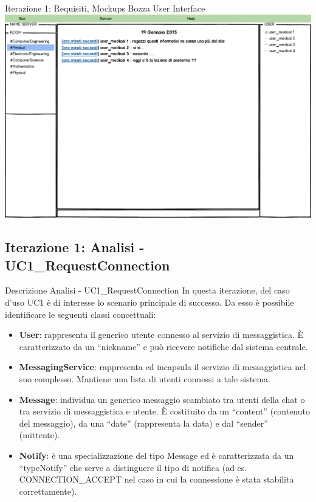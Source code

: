 \documentclass[t]{beamer} %
\let\olditem=\item%
\renewcommand{\item}{\olditem \justifying}%
\begin{document}
\begin{frame} {Iterazione 1: Requisiti, Mockups Bozza User Interface}
    \includegraphics[scale=0.28]{image_mockups/09_snuc_user_room_medical.png}{\centering}
\end{frame}

\subsection{Iterazione 1: Analisi - UC1\_RequestConnection}
\begin{frame}[allowframebreaks] {Descrizione Analisi - UC1\_RequestConnection}
 In questa iterazione, del caso d’uso UC1 è di interesse lo scenario principale di successo.  Da esso è possibile identificare le seguenti classi concettuali: 	
 \begin{itemize}
  \item \textbf{User}: rappresenta il generico utente connesso al servizio di messaggistica. È caratterizzato da un ``nickname'' e può ricevere notifiche dal sistema 
                centrale.
  \item \textbf{MessagingService}: rappresenta ed incapsula il servizio di messaggistica nel suo complesso. Mantiene una lista di utenti connessi a tale sistema.
  \item \textbf{Message}: individua un generico messaggio scambiato tra utenti della chat o tra servizio di messaggistica e utente. È costituito da un 
               ``content'' (contenuto del messaggio), da una ``date'' (rappresenta la data) e dal ``sender'' (mittente).
  \item \textbf{Notify}: è una specializzazione del tipo Message ed è caratterizzata da un ``typeNotify'' che serve a distinguere il tipo di notifica (ad es. 
        CONNECTION\_ACCEPT nel caso in cui la connessione è stata stabilita correttamente).        
 \end{itemize}
\end{frame}
\end{document}
